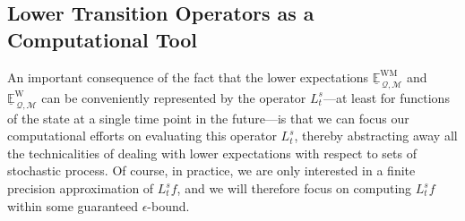 \documentclass[10pt,a4paper]{paper}
\theoremstyle{definition}
\newcommand{\processes}{\mathbb{P}}
\newcommand{\wprocesses}{\processes^{\mathrm{W}}}
\newcommand{\rateset}{\mathcal{Q}}
\newcommand{\lrate}{\underline{Q}}
\newcommand{\coloneqq}{:\!=}
\begin{document}
%
%
%

\subsection{Lower Transition Operators as a Computational Tool}\label{subsec:compute_single_var}

An important consequence of the fact that the lower expectations $\underline{\mathbb{E}}_{\,\rateset,\mathcal{M}}^{\mathrm{WM}}$ and $\underline{\mathbb{E}}_{\,\rateset,\mathcal{M}}^{\mathrm{W}}$ can be conveniently represented by the operator $L_t^s$---at least for functions of the state at a single time point in the future---is that we can focus our computational efforts on evaluating this operator $L_t^s$, thereby abstracting away all the technicalities of dealing with lower expectations with respect to sets of stochastic process. Of course, in practice, we are only interested in a finite precision approximation of $L_t^sf$, and we will therefore focus on computing $L_t^sf$ within some guaranteed $\epsilon$-bound.
\end{document}

